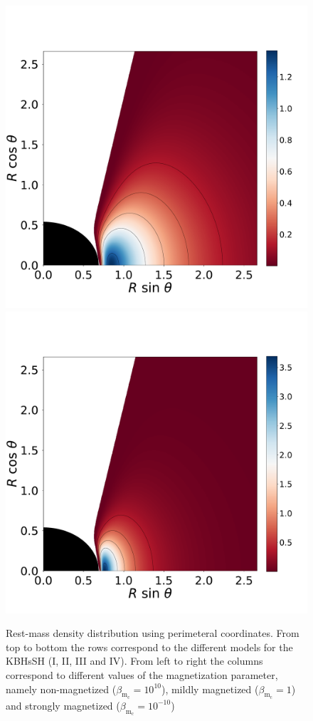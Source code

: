 \documentclass[twocolumn,aps,showpacs,showkeys,prd,superscriptaddress,byrevtex, amsmath]{revtex4-1}
\begin{document}
\begin{figure}
\hspace{-0.3cm}
\includegraphics[scale=0.14]{figures/fig3_IV_1.pdf}
\hspace{-0.2cm}
\includegraphics[scale=0.14]{figures/fig3_IV__10.pdf}
\hspace{-0.2cm}
\caption{Rest-mass density distribution using perimeteral coordinates. From top to bottom the rows correspond to the different models for the KBHsSH (I, II, III and IV). From left to right the columns correspond to different values of the magnetization parameter, namely non-magnetized ($\beta_{\mathrm{m}_{\mathrm{c}}} = 10^{10}$), mildly magnetized ($\beta_{\mathrm{m}_{\mathrm{c}}} = 1$) and strongly magnetized ($\beta_{\mathrm{m}_{\mathrm{c}}} = 10^{-10}$)}
\label{models_peri_I}
\end{figure}
\end{document}
